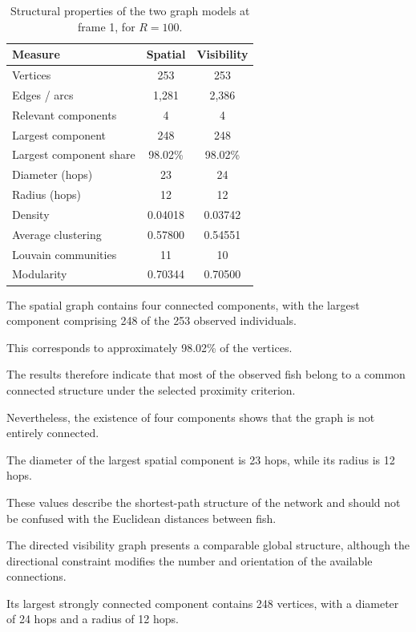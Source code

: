 \documentclass[10pt,a4paper]{article}
\begin{document}
\begin{table}[htbp]
\centering
\caption{Structural properties of the two graph models
at frame 1, for $R=100$.}
\label{tab:structural_results}

\small
\begin{tabular}{lcc}
\hline
\textbf{Measure}
& \textbf{Spatial}
& \textbf{Visibility}\\
\hline
Vertices & 253 & 253\\
Edges / arcs & 1,281 & 2,386\\
Relevant components & 4 & 4\\
Largest component & 248 & 248\\
Largest component share & 98.02\% & 98.02\%\\
Diameter (hops) & 23 & 24\\
Radius (hops) & 12 & 12\\
Density & 0.04018 & 0.03742\\
Average clustering & 0.57800 & 0.54551\\
Louvain communities & 11 & 10\\
Modularity & 0.70344 & 0.70500\\
\hline
\end{tabular}
\end{table}

The spatial graph contains four connected components,
with the largest component comprising 248 of the
253 observed individuals.

This corresponds to approximately 98.02\% of the
vertices.

The results therefore indicate that most of the
observed fish belong to a common connected
structure under the selected proximity criterion.

Nevertheless, the existence of four components
shows that the graph is not entirely connected.

The diameter of the largest spatial component
is 23 hops, while its radius is 12 hops.

These values describe the shortest-path structure
of the network and should not be confused with
the Euclidean distances between fish.

The directed visibility graph presents a comparable
global structure, although the directional
constraint modifies the number and orientation
of the available connections.

Its largest strongly connected component contains
248 vertices, with a diameter of 24 hops
and a radius of 12 hops.
\end{document}
